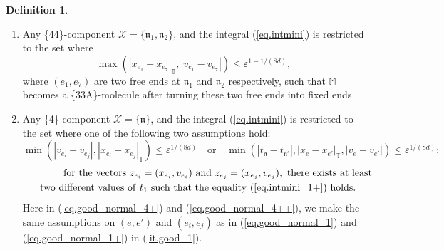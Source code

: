 \documentclass[10pt, reqno]{amsart}
\newcommand{\Mb}{\mathbb M}
\newcommand{\Tb}{\mathbb T}
\newcommand{\Xc}{\mathcal X}
\newcommand{\nf}{\mathfrak n}
\theoremstyle{definition}
\newtheorem{definition}[theorem]{Definition}
\theoremstyle{remark}
\numberwithin{equation}{section}
\begin{document}
\begin{definition}
\begin{enumerate}[resume]
\begin{equation}\label{eq.good_normal_4}|v_{e_i}-v_{e_j}|\geq \varepsilon^{1/(8d)},\quad |t_{\nf_1}-t_{\nf_2}|\geq \varepsilon^{1/(8d)},
\end{equation} for any two distinct edges $(e_i,e_j)$ at the same atom.
\item\label{it.good_44} Any \{44\}-component $\Xc=\{\nf_1,\nf_2\}$, and the integral (\ref{eq.intmini}) is restricted to the set where
\begin{equation}\label{eq.good_normal_3}\max(|x_{e_1}-x_{e_7}|_\Tb,|v_{e_1}-v_{e_7}|)\leq \varepsilon^{1-1/(8d)},
\end{equation} where $(e_1,e_7)$ are two free ends at $\nf_1$ and $\nf_2$ respectively, such that $\Mb$ becomes a \{33A\}-molecule after turning these two free ends into fixed ends.
\item\label{it.good_3} Any \{4\}-component $\Xc=\{\nf\}$, and the integral (\ref{eq.intmini}) is restricted to the set where one of the following two assumptions hold:
\begin{equation}\label{eq.good_normal_4+}\min(|v_{e_i}-v_{e_j}|,|x_{e_i}-x_{e_j}|_\Tb)\leq \varepsilon^{1/(8d)}\quad\textrm{or}\quad \min(|t_\nf-t_{\nf'}|,|x_{e}-x_{e'}|_\Tb,|v_{e}-v_{e'}|)\leq \varepsilon^{1/(8d)};
\end{equation} 
\begin{multline}\label{eq.good_normal_4++}\qquad\qquad\mathrm{for\ the\ vectors\ }z_{e_i}=(x_{e_i},v_{e_i})\mathrm{\ and\ }z_{e_j}=(x_{e_j},v_{e_j}),\mathrm{\ there\ exists\ at\ least}\\ \mathrm{two\ different\ values\ of\ }
t_1\mathrm{\ such\ that\ the\ equality\ }(\ref{eq.intmini_1+})\mathrm{\ holds}.
\end{multline}
Here in (\ref{eq.good_normal_4+}) and (\ref{eq.good_normal_4++}), we make the same assumptions on $(e,e')$ and $(e_i,e_j)$ as in (\ref{eq.good_normal_1}) and (\ref{eq.good_normal_1+}) in (\ref{it.good_1}).
\end{enumerate}
\end{definition}
\end{document}
